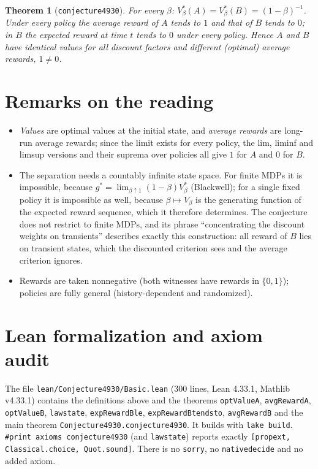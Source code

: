 \documentclass[11pt]{article}
\newtheorem{theorem}{Theorem}
\theoremstyle{definition}
\theoremstyle{remark}
\renewcommand{\_}{\oldus\allowbreak}
\begin{document}
\begin{theorem}[\texttt{conjecture4930}]
For every $\beta$: $V^*_\beta(A)=V^*_\beta(B)=(1-\beta)^{-1}$. Under every policy the average reward
of $A$ tends to $1$ and that of $B$ tends to $0$; in $B$ the expected reward at time $t$ tends to
$0$ under every policy. Hence $A$ and $B$ have identical values for all discount factors and
different (optimal) average rewards, $1\neq0$.
\end{theorem}

\section{Remarks on the reading}

\begin{itemize}
\item \emph{Values} are optimal values at the initial state, and \emph{average rewards} are long-run
average rewards; since the limit exists for every policy, the lim, liminf and limsup versions and
their suprema over policies all give $1$ for $A$ and $0$ for $B$.
\item The separation needs a countably infinite state space. For finite MDPs it is impossible,
because $g^*=\lim_{\beta\uparrow1}(1-\beta)V^*_\beta$ (Blackwell); for a single fixed policy it is
impossible as well, because $\beta\mapsto V_\beta$ is the generating function of the expected
reward sequence, which it therefore determines. The conjecture does not restrict to finite MDPs,
and its phrase ``concentrating the discount weights on transients'' describes exactly this
construction: all reward of $B$ lies on transient states, which the discounted criterion sees and
the average criterion ignores.
\item Rewards are taken nonnegative (both witnesses have rewards in $\{0,1\}$); policies are fully
general (history-dependent and randomized).
\end{itemize}

\section{Lean formalization and axiom audit}

The file \texttt{lean/Conjecture4930/Basic.lean} (300 lines, Lean 4.33.1, Mathlib v4.33.1) contains
the definitions above and the theorems \texttt{optValue\_A}, \texttt{avgReward\_A},
\texttt{optValue\_B}, \texttt{law\_state}, \texttt{expReward\_B\_le}, \texttt{expReward\_B\_tendsto},
\texttt{avgReward\_B} and the main theorem \texttt{Conjecture4930.conjecture4930}. It builds with
\texttt{lake build}. \texttt{\#print axioms conjecture4930} (and \texttt{law\_state}) reports exactly
\texttt{[propext, Classical.choice, Quot.sound]}. There is no \texttt{sorry}, no
\texttt{native\_decide} and no added axiom.
\end{document}
